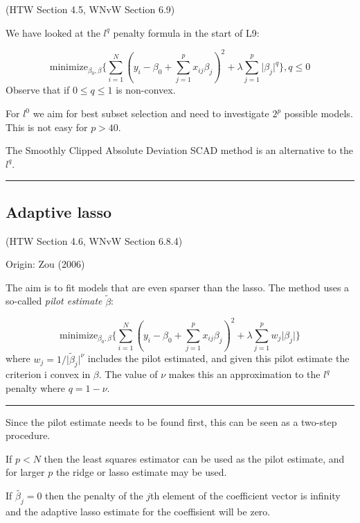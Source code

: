 \documentclass[
  letterpaper,
  DIV=11,
  numbers=noendperiod]{scrartcl}
\begin{document}
(HTW Section 4.5, WNvW Section 6.9)

We have looked at the \(l^q\) penalty formula in the start of L9:

\[ \text{minimize}_{\beta_0,\beta} \{ \sum_{i=1}^N (y_i-\beta_0+\sum_{j=1}^p x_{ij}\beta_j )^2 + \lambda \sum_{j=1}^p \lvert \beta_j\rvert^q \}, q\le 0\]
Observe that if \(0\le q \le 1\) is non-convex.

For \(l^0\) we aim for best subset selection and need to investigate
\(2^p\) possible models. This is not easy for \(p>40\).

The Smoothly Clipped Absolute Deviation SCAD method is an alternative to
the \(l^q\).

\begin{center}\rule{0.5\linewidth}{0.5pt}\end{center}

\hypertarget{adaptive-lasso}{%
\subsection{Adaptive lasso}\label{adaptive-lasso}}

(HTW Section 4.6, WNvW Section 6.8.4)

Origin: Zou (2006)

The aim is to fit models that are even sparser than the lasso. The
method uses a so-called \emph{pilot estimate} \(\tilde{\beta}\):

\[ \text{minimize}_{\beta_0,\beta} \{ \sum_{i=1}^N (y_i-\beta_0+\sum_{j=1}^p x_{ij}\beta_j )^2 + \lambda \sum_{j=1}^p w_j \lvert \beta_j\rvert \}\]
where \(w_j=1/{\lvert \tilde{\beta}_j}\rvert ^{\nu}\) includes the pilot
estimated, and given this pilot estimate the criterion i convex in
\(\beta\). The value of \(\nu\) makes this an approximation to the
\(l^q\) penalty where \(q=1-\nu\).

\begin{center}\rule{0.5\linewidth}{0.5pt}\end{center}

Since the pilot estimate needs to be found first, this can be seen as a
two-step procedure.

If \(p<N\) then the least squares estimator can be used as the pilot
estimate, and for larger \(p\) the ridge or lasso estimate may be used.

If \(\tilde{\beta_j}=0\) then the penalty of the \(j\)th element of the
coefficient vector is infinity and the adaptive lasso estimate for the
coeffisient will be zero.
\end{document}
